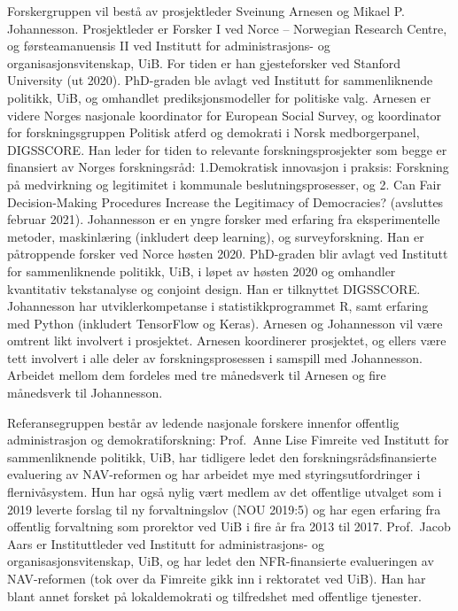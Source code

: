 \documentclass[
]{book}
\begin{document}
Forskergruppen vil bestå av prosjektleder Sveinung Arnesen og Mikael P. Johannesson. Prosjektleder er Forsker I ved Norce -- Norwegian Research Centre, og førsteamanuensis II ved Institutt for administrasjons- og organisasjonsvitenskap, UiB. For tiden er han gjesteforsker ved Stanford University (ut 2020). PhD-graden ble avlagt ved Institutt for sammenliknende politikk, UiB, og omhandlet prediksjonsmodeller for politiske valg. Arnesen er videre Norges nasjonale koordinator for European Social Survey, og koordinator for forskningsgruppen Politisk atferd og demokrati i Norsk medborgerpanel, DIGSSCORE. Han leder for tiden to relevante forskningsprosjekter som begge er finansiert av Norges forskningsråd: 1.Demokratisk innovasjon i praksis: Forskning på medvirkning og legitimitet i kommunale beslutningsprosesser, og 2. Can Fair Decision-Making Procedures Increase the Legitimacy of Democracies? (avsluttes februar 2021). Johannesson er en yngre forsker med erfaring fra eksperimentelle metoder, maskinlæring (inkludert deep learning), og surveyforskning. Han er påtroppende forsker ved Norce høsten 2020. PhD-graden blir avlagt ved Institutt for sammenliknende politikk, UiB, i løpet av høsten 2020 og omhandler kvantitativ tekstanalyse og conjoint design. Han er tilknyttet DIGSSCORE. Johannesson har utviklerkompetanse i statistikkprogrammet R, samt erfaring med Python (inkludert TensorFlow og Keras). Arnesen og Johannesson vil være omtrent likt involvert i prosjektet. Arnesen koordinerer prosjektet, og ellers være tett involvert i alle deler av forskningsprosessen i samspill med Johannesson. Arbeidet mellom dem fordeles med tre månedsverk til Arnesen og fire månedsverk til Johannesson.

Referansegruppen består av ledende nasjonale forskere innenfor offentlig administrasjon og demokratiforskning:
Prof.~Anne Lise Fimreite ved Institutt for sammenliknende politikk, UiB, har tidligere ledet den forskningsrådsfinansierte evaluering av NAV-reformen og har arbeidet mye med styringsutfordringer i flernivåsystem.
Hun har også nylig vært medlem av det offentlige utvalget som i 2019 leverte forslag til ny forvaltningslov (NOU 2019:5) og har egen erfaring fra offentlig forvaltning som prorektor ved UiB i fire år fra 2013 til 2017.
Prof.~Jacob Aars er Instituttleder ved Institutt for administrasjons- og organisasjonsvitenskap, UiB, og har ledet den NFR-finansierte evalueringen av NAV-reformen (tok over da Fimreite gikk inn i rektoratet ved UiB).
Han har blant annet forsket på lokaldemokrati og tilfredshet med offentlige tjenester.
\end{document}
